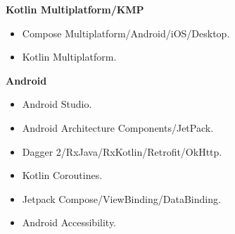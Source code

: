 \documentclass[10pt,a4paper,withhyper]{altacv}
\begin{document}
\begin{paracol}{2}














\textbf{Kotlin Multiplatform/KMP}

\begin{itemize}
	\item Compose Multiplatform/Android/iOS/Desktop.
	\item Kotlin Multiplatform.
\end{itemize}
\divider

\textbf{Android}

\begin{itemize}
	\item Android Studio.
	\item Android Architecture Components/JetPack.
	\item Dagger 2/RxJava/RxKotlin/Retrofit/OkHttp.
	\item Kotlin Coroutines.
	\item Jetpack Compose/ViewBinding/DataBinding.
	\item Android Accessibility.
\end{itemize}
\divider


\end{paracol}
\end{document}
